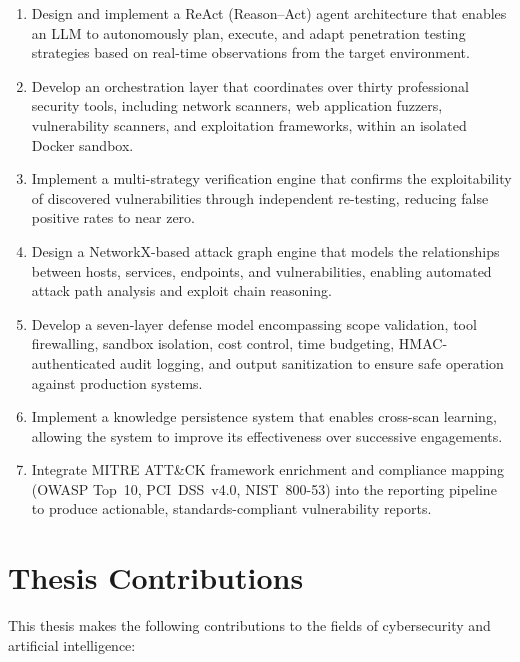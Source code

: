 \begin{enumerate}[label=\textbf{O\arabic*.}]
    \item Design and implement a ReAct (Reason--Act) agent architecture that enables an LLM to autonomously plan, execute, and adapt penetration testing strategies based on real-time observations from the target environment.
    \item Develop an orchestration layer that coordinates over thirty professional security tools, including network scanners, web application fuzzers, vulnerability scanners, and exploitation frameworks, within an isolated Docker sandbox.
    \item Implement a multi-strategy verification engine that confirms the exploitability of discovered vulnerabilities through independent re-testing, reducing false positive rates to near zero.
    \item Design a NetworkX-based attack graph engine that models the relationships between hosts, services, endpoints, and vulnerabilities, enabling automated attack path analysis and exploit chain reasoning.
    \item Develop a seven-layer defense model encompassing scope validation, tool firewalling, sandbox isolation, cost control, time budgeting, HMAC-authenticated audit logging, and output sanitization to ensure safe operation against production systems.
    \item Implement a knowledge persistence system that enables cross-scan learning, allowing the system to improve its effectiveness over successive engagements.
    \item Integrate MITRE ATT\&CK framework enrichment and compliance mapping (OWASP Top~10, PCI~DSS~v4.0, NIST~800-53) into the reporting pipeline to produce actionable, standards-compliant vulnerability reports.
\end{enumerate}

\section{Thesis Contributions}
\label{sec:contributions}

This thesis makes the following contributions to the fields of cybersecurity and artificial intelligence:

